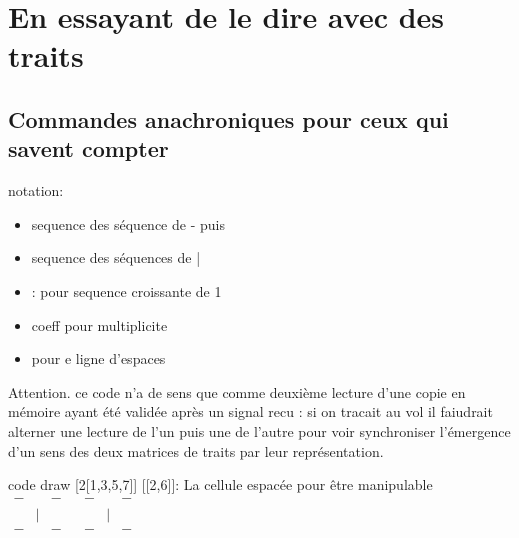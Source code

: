 \documentclass{article}
\begin{document}


\section{En essayant de le dire  avec des traits}

\subsection{Commandes anachroniques pour ceux qui savent compter }
notation:
\begin{itemize}
\item  sequence des  séquence de - puis
\item  sequence des séquences de | 
\item   : pour sequence croissante de 1  
\item  coeff pour multiplicite
\item [] pour e ligne d'espaces
\end{itemize}

Attention.  ce code n'a de sens que comme deuxième lecture d'une copie en mémoire ayant été validée  après un signal recu :
 si on tracait au vol il faiudrait alterner une lecture de l'un puis une de l'autre pour voir synchroniser l'émergence d'un sens des deux matrices de traits par leur représentation.
 
code  draw [2[1,3,5,7]] [[2,6]]:
La cellule espacée pour être manipulable  $
{\scriptscriptstyle\begin{matrix}
- &   & - &   & - &   & - \\
  & | &   &   &   &  | &   \\
- &   & - &   & - &   & - \\
\end{matrix}}$
\end{document}

